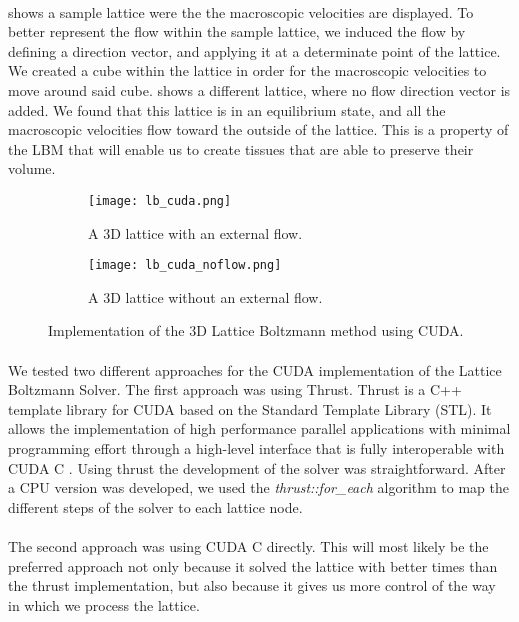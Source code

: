 \paragraph{} shows a sample lattice were the the macroscopic velocities are displayed. To better represent the flow within the sample lattice, we induced the flow by defining a direction vector, and applying it at a determinate point of the lattice. We created a cube within the lattice in order for the macroscopic velocities to move around said cube.  shows a different lattice, where no flow direction vector is added. We found that this lattice is in an equilibrium state, and all the macroscopic velocities flow toward the outside of the lattice. This is a property of the LBM that will enable us to create tissues that are able to preserve their volume.

\begin{figure}[t]
    \centering
    \begin{subfigure}[h]{0.45\textwidth}
        \centering
    		\texttt{[image: lb\_cuda.png]}
    		\caption{A 3D lattice with an external flow.}
    		\label{fig:lb_cuda}
    \end{subfigure}
	\hfill
    \begin{subfigure}[h]{0.45\textwidth}
        \centering
        \texttt{[image: lb\_cuda\_noflow.png]}
        \caption{A 3D lattice without an external flow.}
        \label{fig:lb_cuda_noflow}
    \end{subfigure}

    \caption{Implementation of the 3D Lattice Boltzmann method using CUDA.}
    \label{fig:d3q19}
\end{figure}

\paragraph{}We tested two different approaches for the CUDA implementation of the Lattice Boltzmann Solver. The first approach was using Thrust. Thrust is a C++ template library for CUDA based on the Standard Template Library (STL). It allows the implementation of high performance parallel applications with minimal programming effort through a high-level interface that is fully interoperable with CUDA C \citep{nvidia2015thrust}. Using thrust the development of the solver was straightforward. After a CPU version was developed, we used the \textit{thrust::for\_each} algorithm to map the different steps of the solver to each lattice node. 


\paragraph{}The second approach was using CUDA C directly. This will most likely be the preferred approach not only because it solved the lattice with better times than the thrust implementation, but also because it gives us more control of the way in which we process the lattice.



